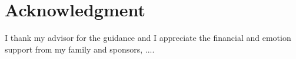 \section{Acknowledgment}
I thank my advisor for the guidance and I appreciate the financial and emotion support from my family and sponsors, .... 